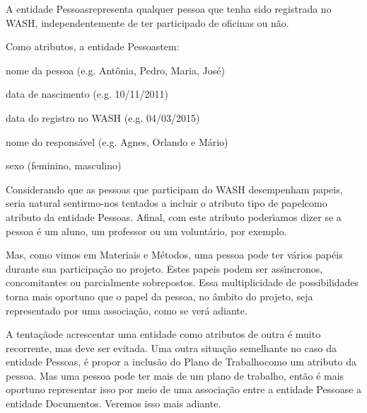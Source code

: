 \documentclass[
12pt,		%
openright,	%
twoside,  %
a4paper,			%
chapter=TITLE,		%
english,			%
french,				%
spanish,			%
brazil				%
]{USPSC-classe/USPSC}
\begin{document}
A entidade \textquotedbl Pessoas\textquotedbl  representa qualquer pessoa que tenha sido registrada no WASH, independentemente de ter participado de oficinas ou n\~ao.










Como atributos, a entidade \textquotedbl Pessoas\textquotedbl  tem:











\begin{alineas}
\item nome da pessoa (e.g. Ant\^onia, Pedro, Maria, Jos\'e)
\item data de nascimento (e.g. 10/11/2011)
\item data do registro no WASH (e.g. 04/03/2015)
\item nome do respons\'avel (e.g. Agnes, Orlando e M\'ario)
\item sexo (feminino, masculino)
\end{alineas}

Considerando que as pessoas que participam do WASH desempenham \textquotedbl papeis\textquotedbl , seria natural sentirmo-nos tentados a incluir o atributo \textquotedbl tipo de papel\textquotedbl  como atributo da entidade \textquotedbl Pessoas\textquotedbl . Afinal, com este atributo poder\'{\i}amos dizer se a pessoa \'e um aluno, um professor ou um volunt\'ario, por exemplo.










Mas, como vimos em Materiais e M\'etodos, uma pessoa pode ter v\'arios pap\'eis durante sua participa\c{c}\~ao no projeto. Estes papeis podem ser ass\'{\i}ncronos, concomitantes ou parcialmente sobrepostos. Essa multiplicidade de possibilidades torna mais oportuno que  o papel da pessoa, no \^ambito do projeto, seja representado por uma associa\c{c}\~ao, como se ver\'a adiante.










A \textquotedbl tenta\c{c}\~ao\textquotedbl  de acrescentar uma entidade como atributos de outra \'e muito recorrente, mas deve ser evitada. Uma outra situa\c{c}\~ao semelhante no caso da entidade \textquotedbl Pessoas\textquotedbl , \'e propor a inclus\~ao do \textquotedbl Plano de Trabalho\textquotedbl  como um atributo da pessoa. Mas uma pessoa pode ter mais de um plano de trabalho, ent\~ao \'e mais oportuno representar isso por meio de uma associa\c{c}\~ao entre a entidade \textquotedbl Pessoas\textquotedbl  e a entidade \textquotedbl Documentos\textquotedbl . Veremos isso mais adiante.
\end{document}
